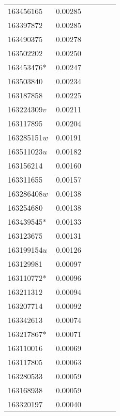 \begin{landscape}
\begin{longtable}{p{1.8cm}p{0.9cm}p{2.2cm}p{1cm}p{2.8cm}p{13.4cm}}
163456165&0.00285&&&& \\
163397872&0.00285&&&& \\
163490375&0.00278&&&& \\
163502202&0.00250&&&& \\
163453476*&0.00247&&&& \\
163503840&0.00234&&&& \\
163187858&0.00225&&&& \\
163224309$v$&0.00211&&&& \\
163117895&0.00204&&&& \\
163285151$w$&0.00191&&&& \\
163511023$u$&0.00182&&&& \\
163156214&0.00160&&&& \\
163311655&0.00157&&&& \\
163286408$w$&0.00138&&&& \\
163254680&0.00138&&&& \\
163439545*&0.00133&&&& \\
163123675&0.00131&&&& \\
163199154$u$&0.00126&&&& \\
163129981&0.00097&&&& \\
163110772*&0.00096&&&& \\
163211312&0.00094&&&& \\
163207714&0.00092&&&& \\
163342613&0.00074&&&& \\
163217867*&0.00071&&&& \\
163110016&0.00069&&&& \\
163117805&0.00063&&&& \\
163280533&0.00059&&&& \\
163168938&0.00059&&&& \\
163320197&0.00040&&&& \\
\end{longtable}
\endgroup
\end{landscape}
